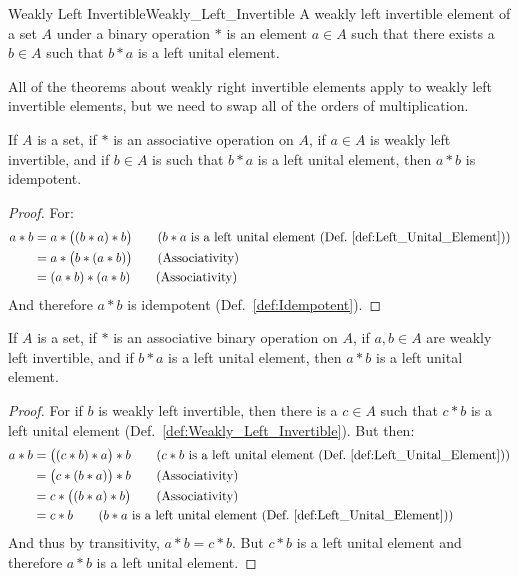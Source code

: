     \begin{fdefinition}{Weakly Left Invertible}{Weakly_Left_Invertible}
        A weakly left invertible element of a \gls{set} $A$ under a
        \gls{binary operation} $*$ is an element $a\in{A}$ such that there
        exists a $b\in{A}$ such that $b*a$ is a left unital element.
    \end{fdefinition}
    All of the theorems about weakly right invertible elements apply to weakly
    left invertible elements, but we need to swap all of the orders of
    multiplication.
    \begin{theorem}
        If $A$ is a set, if $*$ is an associative operation on $A$, if $a\in{A}$
        is weakly left invertible, and if $b\in{A}$ is such that $b*a$ is a left
        unital element, then $a*b$ is idempotent.
    \end{theorem}
    \begin{proof}
        For:
        \begin{align}
            a*b&=a*\big((b*a)*b\big)
            \tag{$b*a$ is a left unital element %
                 (Def.~\ref{def:Left_Unital_Element})}\\
            &=a*\big(b*(a*b)\big)
            \tag{Associativity}\\
            &=(a*b)*(a*b)
            \tag{Associativity}
        \end{align}
        And therefore $a*b$ is idempotent (Def.~\ref{def:Idempotent}). 
    \end{proof}
    \begin{theorem}
        \label{thm:ba_left_unital_implies_ab_left_unital}%
        If $A$ is a set, if $*$ is an associative binary operation on $A$, if
        $a,b\in{A}$ are weakly left invertible, and if $b*a$ is a left unital
        element, then $a*b$ is a left unital element.
    \end{theorem}
    \begin{proof}
        For if $b$ is weakly left invertible, then there is a $c\in{A}$ such
        that $c*b$ is a left unital element
        (Def.~\ref{def:Weakly_Left_Invertible}). But then:
        \begin{align}
            a*b&=\big((c*b)*a\big)*b
            \tag{$c*b$ is a left unital element %
                (Def.~\ref{def:Left_Unital_Element})}\\
            &=\big(c*(b*a)\big)*b
            \tag{Associativity}\\
            &=c*\big((b*a)*b\big)
            \tag{Associativity}\\
            &=c*b
            \tag{$b*a$ is a left unital element %
                 (Def.~\ref{def:Left_Unital_Element})}
        \end{align}
        And thus by transitivity, $a*b=c*b$. But $c*b$ is a left unital element
        and therefore $a*b$ is a left unital element.
    \end{proof}
